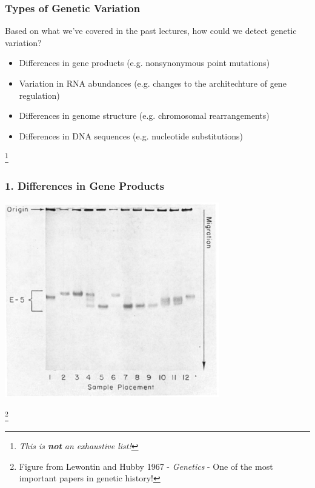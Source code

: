 \documentclass{beamer}
\newcommand\blfootnote[1]{%
	\begingroup
	\renewcommand\thefootnote{}\footnote{#1}%
	\addtocounter{footnote}{-1}%
	\endgroup
}
\begin{document}
	
\begin{frame}
		\frametitle{Types of Genetic Variation}
Based on what we've covered in the past lectures, how could we detect genetic variation? \\ \pause
	\vspace{10pt}

				\scriptsize
				\begin{itemize}
					\item[\textbf{1}] Differences in gene products (e.g. nonsynonymous point mutations)
					\item[\textbf{2}] Variation in RNA abundances (e.g. changes to the architechture of gene regulation)
					\item[\textbf{3}] Differences in genome structure (e.g. chromosomal rearrangements)
					\item[\textbf{4}] Differences in DNA sequences (e.g. nucleotide substitutions)
				\end{itemize}
				
				\blfootnote{\textit{This is \textbf{not} an exhaustive list!}}
		
	\end{frame}
	
	
	
	\begin{frame}
		\frametitle{1. Differences in Gene Products}
		
		
\centering				\includegraphics[keepaspectratio, width  = 0.7\textwidth]{img/LewontinHubby}
		
		\blfootnote{Figure from Lewontin and Hubby 1967 - \textit{Genetics} - One of the most important papers in genetic history!}
		
		
	\end{frame}
\end{document}
